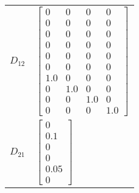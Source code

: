 \begin{tabular}{cl}
 $D_{12}$ & $\left[\begin{matrix}0 & 0 & 0 & 0\\0 & 0 & 0 & 0\\0 & 0 & 0 & 0\\0 & 0 & 0 & 0\\0 & 0 & 0 & 0\\0 & 0 & 0 & 0\\1.0 & 0 & 0 & 0\\0 & 1.0 & 0 & 0\\0 & 0 & 1.0 & 0\\0 & 0 & 0 & 1.0\end{matrix}\right]$                                                                                                                                                                                                                                                                                                        \\
 $D_{21}$ & $\left[\begin{matrix}0\\0.1\\0\\0\\0.05\\0\end{matrix}\right]$                                                                                                                                                                                                                                                                                                                                                                                                                                               \\
\hline
\end{tabular}